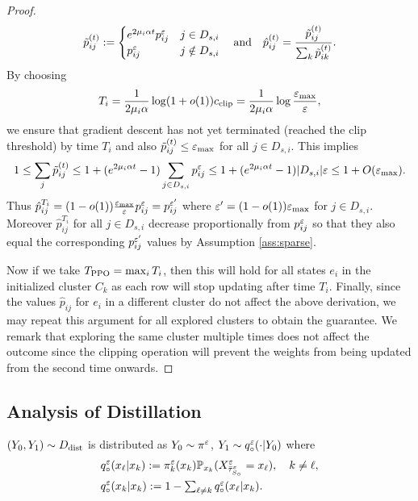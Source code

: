 \begin{proof}
\begin{align*}
\tilde{p}_{ij}^{(t)} := \begin{cases}
e^{2\mu_i\alpha t} p_{ij}^\varepsilon & j\in D_{s,i} \\
p_{ij}^\varepsilon & j\notin D_{s,i}
\end{cases} \quad\text{and}\quad \hat{p}_{ij}^{(t)} = \frac{\tilde{p}_{ij}^{(t)}}{\sum_k \tilde{p}_{ik}^{(t)}}.
\end{align*}
By choosing
\begin{equation*}
T_i = \frac{1}{2\mu_i\alpha}\log (1+o(1))c_{\operatorname{clip}} = \frac{1}{2\mu_i\alpha}\log\frac{\varepsilon_{\max}}{\varepsilon},
\end{equation*}
we ensure that gradient descent has not yet terminated (reached the clip threshold) by time $T_i$ and also $\tilde{p}_{ij}^{(t)} \le\varepsilon_{\max}$ for all $j\in D_{s,i}$. This implies
\begin{align*}
1\le \sum_j \tilde{p}_{ij}^{(t)} \le 1+ (e^{2\mu_i\alpha t}-1)\sum_{j\in D_{s,i}} p_{ij}^\varepsilon \le 1 +(e^{2\mu_i\alpha t}-1)|D_{s,i}|\varepsilon \le 1+O(\varepsilon_{\max}).
\end{align*}
Thus $\hat{p}_{ij}^{T_i} = (1-o(1))\frac{\varepsilon_{\max}}{\varepsilon} p_{ij}^\varepsilon = p_{ij}^{\varepsilon'}$ where $\varepsilon'=(1-o(1))\varepsilon_{\max}$ for $j\in D_{s,i}$. Moreover $\hat{p}_{ij}^{T_i}$ for all $j\in D_{s,i}$ decrease proportionally from $p_{ij}^\varepsilon$ so that they also equal the corresponding $p_{ij}^{\varepsilon'}$ values by Assumption \ref{ass:sparse}.

Now if we take $T_{\operatorname{PPO}} = \max_i T_i$, then this will hold for all states $e_i$ in the initialized cluster $C_k$ as each row will stop updating after time $T_i$. Finally, since the values $\hat{p}_{ij}$ for $e_i$ in a different cluster do not affect the above derivation, we may repeat this argument for all explored clusters to obtain the guarantee. We remark that exploring the same cluster multiple times does not affect the outcome since the clipping operation will prevent the weights from being updated from the second time onwards.
\end{proof}


\subsection{Analysis of Distillation}


\begin{lemma}\label{thm:qq}
$(Y_0,Y_1)\sim D_{\operatorname{dist}}$ is distributed as $Y_0\sim\pi^\varepsilon$, $Y_1\sim q_\circ^\varepsilon(\cdot|Y_0)$ where
\begin{align*}
&q_\circ^\varepsilon(x_\ell|x_k) := \pi_k^\varepsilon(x_k)\mathbb{P}_{x_k}(X_{\bar{\tau}_{S_\circ}^\varepsilon}^\varepsilon = x_\ell), \quad k\neq\ell,\\
&q_\circ^\varepsilon(x_k|x_k) := 1-\textstyle\sum_{\ell\ne k} q_\circ^\varepsilon(x_\ell|x_k).
\end{align*}
\end{lemma}


